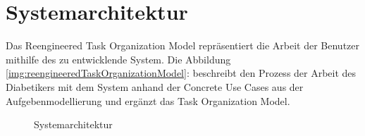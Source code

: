 \section{Systemarchitektur}
Das Reengineered Task Organization Model repräsentiert die Arbeit der Benutzer mithilfe des zu entwicklende System. Die Abbildung \ref{img:reengineeredTaskOrganizationModel}:  beschreibt den Prozess der Arbeit des Diabetikers mit dem System anhand der Concrete Use Cases aus der Aufgebenmodellierung und ergänzt das Task Organization Model.
\begin{figure}[H]
	\centering
	\setlength{\fboxsep}{1pt}
	\setlength{\fboxrule}{1pt}
	\captionsetup{justification=centering}
	\caption{Systemarchitektur}
	\label{img:Systemarchitektur}
\end{figure}